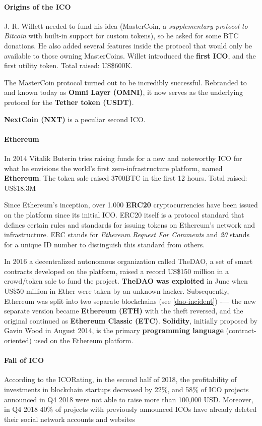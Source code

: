\paragraph{Origins of the ICO} J. R. Willett needed to fund his idea (MasterCoin, a \emph{supplementary protocol to Bitcoin} with built-in support for custom tokens), so he asked for some BTC donations. He also added several features inside the protocol that would only be available to those owning MasterCoins.
Willet introduced the \textbf{first ICO}, and the first utility token.
Total raised: US\$600K.

The MasterCoin protocol turned out to be incredibly successful. Rebranded to and known today as \textbf{Omni Layer (OMNI)}, it now serves as the underlying protocol for the \textbf{Tether token (USDT)}.

\textbf{NextCoin (NXT)} is a peculiar second ICO.

\paragraph{Ethereum}
In 2014 Vitalik Buterin tries raising funds for a new and noteworthy ICO for what he envisions the world's first zero-infrastructure platform, named \textbf{Ethereum}.
The token sale raised 3700BTC in the first 12 hours.
Total raised: US\$18.3M

Since Ethereum's inception, over 1.000 \textbf{ERC20} cryptocurrencies have been issued on the platform since its initial ICO. ERC20 itself is a protocol standard that defines certain rules and standards for issuing tokens on Ethereum's network and infrastructure. ERC stands for \emph{Ethereum Request For Comments} and \emph{20} stands for a unique ID number to distinguish this standard from others.

In 2016 a decentralized autonomous organization called TheDAO, a set of smart contracts developed on the platform, raised a record US\$150 million in a crowd/token sale to fund the project. \textbf{TheDAO was exploited} in June when US\$50 million in Ether were taken by an unknown hacker. Subsequently, Ethereum was split into two separate blockchains (see \ref{dao-incident}) -— the new separate version became \textbf{Ethereum (ETH)} with the theft reversed, and the original continued as \textbf{Ethereum Classic (ETC)}.
\textbf{Solidity}, initially proposed by Gavin Wood in August 2014, is the primary \textbf{programming language} (contract-oriented) used on the Ethereum platform.

\paragraph{Fall of ICO}
According to the ICORating, in the second half of 2018, the profitability of investments in blockchain startups decreased by 22\%, and 58\% of ICO projects announced in Q4 2018 were not able to raise more than 100,000 USD. Moreover, in Q4 2018 40\% of projects with previously announced ICOs have already deleted their social network accounts and websites

